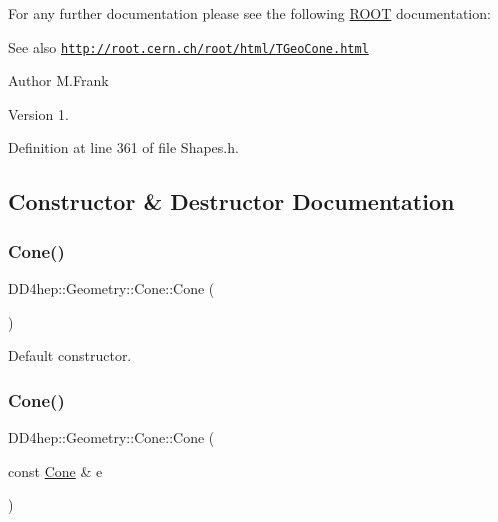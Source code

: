 For any further documentation please see the following \hyperlink{namespace_r_o_o_t}{R\+O\+OT} documentation\+: \begin{DoxySeeAlso}{See also}
\href{http://root.cern.ch/root/html/TGeoCone.html}{\tt http\+://root.\+cern.\+ch/root/html/\+T\+Geo\+Cone.\+html}
\end{DoxySeeAlso}
\begin{DoxyAuthor}{Author}
M.\+Frank 
\end{DoxyAuthor}
\begin{DoxyVersion}{Version}
1. 
\end{DoxyVersion}


Definition at line 361 of file Shapes.\+h.



\subsection{Constructor \& Destructor Documentation}
\hypertarget{class_d_d4hep_1_1_geometry_1_1_cone_ad4ad806a987019631449f18f0bc42425}{}\label{class_d_d4hep_1_1_geometry_1_1_cone_ad4ad806a987019631449f18f0bc42425} 
\subsubsection{\texorpdfstring{Cone()}{Cone()}\hspace{0.1cm}{\footnotesize\ttfamily [1/6]}}
{\footnotesize\ttfamily D\+D4hep\+::\+Geometry\+::\+Cone\+::\+Cone (\begin{DoxyParamCaption}{ }\end{DoxyParamCaption})\hspace{0.3cm}{\ttfamily [default]}}



Default constructor. 

\hypertarget{class_d_d4hep_1_1_geometry_1_1_cone_af9007c2bd28a81b9708feebe8b8ac249}{}\label{class_d_d4hep_1_1_geometry_1_1_cone_af9007c2bd28a81b9708feebe8b8ac249} 
\subsubsection{\texorpdfstring{Cone()}{Cone()}\hspace{0.1cm}{\footnotesize\ttfamily [2/6]}}
{\footnotesize\ttfamily D\+D4hep\+::\+Geometry\+::\+Cone\+::\+Cone (\begin{DoxyParamCaption}\item[{const \hyperlink{class_d_d4hep_1_1_geometry_1_1_cone}{Cone} \&}]{e }\end{DoxyParamCaption})\hspace{0.3cm}{\ttfamily [default]}}



